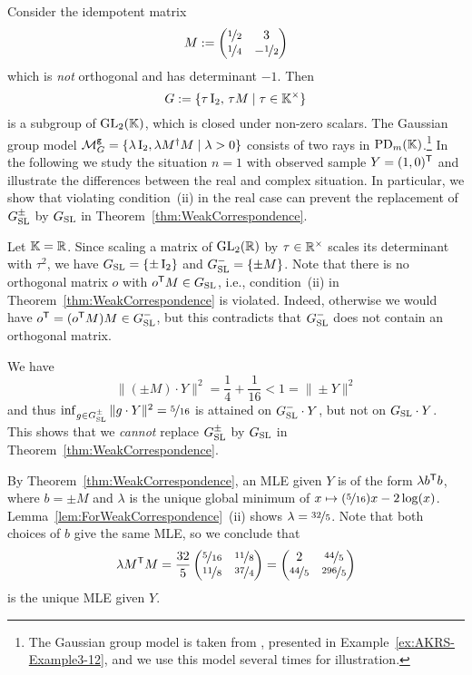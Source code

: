 \begin{example}\label{ex:EasyCounterexampleASLpm}
	Consider the idempotent matrix
		\[M := \begin{pmatrix}
			\nicefrac{1}{2} & 3 \\ \nicefrac{1}{4} & - \nicefrac{1}{2}
		\end{pmatrix} \]
	which is \emph{not} orthogonal and has determinant $-1$. Then
		\begin{equation}\label{eq:GroupEasyCounterexampleASLpm}
			G := \{ \tau \operatorname{I}_2, \, \tau M \mid \tau \in \mathbb K^{\times} \}
		\end{equation}
	is a subgroup of $\operatorname{GL}_2(\mathbb K)$, which is closed under non-zero scalars. The Gaussian group model $\mathcal{M}^{\mathtt{g}}_G = \{ \lambda \operatorname{I}_2, \lambda M^{\dagger} M \mid \lambda > 0\}$ consists of two rays in $\operatorname{PD}_m(\mathbb K)$.\footnote{The Gaussian group model is taken from \cite[Example~3.12]{SiagaPaper}, presented in Example~\ref{ex:AKRS-Example3-12}, and we use this model several times for illustration.} In the following we study the situation $n=1$ with observed sample $Y = (1, 0)^{\mathsf{T}}$ and illustrate the differences between the real and complex situation. In particular, we show that violating condition~(ii) in the real case can prevent the replacement of $G_{\operatorname{SL}}^{\pm}$ by $G_{\operatorname{SL}}$ in Theorem~\ref{thm:WeakCorrespondence}.
	
	Let $\mathbb K = \mathbb R$. Since scaling a matrix of $\operatorname{GL}_2(\mathbb R)$ by $\tau \in \mathbb R^{\times}$ scales its determinant with $\tau^2$, we have $G_{\operatorname{SL}} = \{ \pm \operatorname{I}_2\}$ and $G_{\operatorname{SL}}^{-} = \{ \pm M\}$.
	Note that there is no orthogonal matrix $o$ with $o^{\mathsf{T}} M \in G_{\operatorname{SL}}$, i.e., condition~(ii) in Theorem~\ref{thm:WeakCorrespondence} is violated. Indeed, otherwise we would have $o^{\mathsf{T}}  = (o ^{\mathsf{T}} M) M \in G_{\operatorname{SL}}^{-}$, but this contradicts that $G_{\operatorname{SL}}^{-}$ does not contain an orthogonal matrix.
	
	We have 
		\[ \| (\pm M) \cdot Y \|^2 = \frac{1}{4} + \frac{1}{16} < 1 = \| \pm Y \|^2 \]
	and thus $\inf_{g \in G_{\operatorname{SL}}^{\pm}} \| g \cdot Y \|^2 = \nicefrac{5}{16}$ is attained on $G_{\operatorname{SL}}^{-} \cdot Y$, but not on $G_{\operatorname{SL}} \cdot Y$. This shows that we \emph{cannot} replace $G_{\operatorname{SL}}^{\pm}$ by $G_{\operatorname{SL}}$ in Theorem~\ref{thm:WeakCorrespondence}.
	
	By Theorem~\ref{thm:WeakCorrespondence}, an MLE given $Y$ is of the form $\lambda b^{\mathsf{T}} b$, where $b = \pm M$ and $\lambda$ is the unique global minimum of $x \mapsto (\nicefrac{5}{16}) x - 2\log(x)$. Lemma~\ref{lem:ForWeakCorrespondence}~(ii) shows $\lambda = \nicefrac{32}{5}$. Note that both choices of $b$ give the same MLE, so we conclude that
	\[\lambda M^{\mathsf{T}} M = \frac{32}{5} \begin{pmatrix} \nicefrac{5}{16} & \nicefrac{11}{8} \\ \nicefrac{11}{8} & \nicefrac{37}{4} \end{pmatrix} 
	= \begin{pmatrix} 2 & \nicefrac{44}{5} \\ \nicefrac{44}{5} & \nicefrac{296}{5} \end{pmatrix}  \]
	is the unique MLE given $Y$.
	

\end{example}
